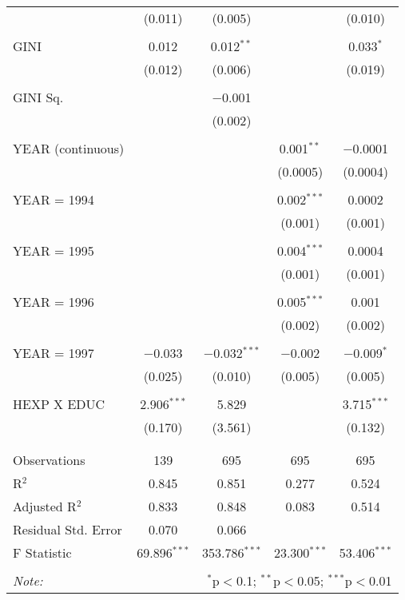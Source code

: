 \documentclass[12pt,a4paper]{article}\usepackage[]{graphicx}\usepackage[]{color}
\begin{document}
\begin{table}[!htbp]
\begin{tabular}{@{\extracolsep{5pt}}lcccc}
  & (0.011) & (0.005) &  & (0.010) \\ 
  & & & & \\ 
 GINI & 0.012 & 0.012$^{**}$ &  & 0.033$^{*}$ \\ 
  & (0.012) & (0.006) &  & (0.019) \\ 
  & & & & \\ 
 GINI Sq. &  & $-$0.001 &  &  \\ 
  &  & (0.002) &  &  \\ 
  & & & & \\ 
 YEAR (continuous) &  &  & 0.001$^{**}$ & $-$0.0001 \\ 
  &  &  & (0.0005) & (0.0004) \\ 
  & & & & \\ 
 YEAR = 1994 &  &  & 0.002$^{***}$ & 0.0002 \\ 
  &  &  & (0.001) & (0.001) \\ 
  & & & & \\ 
 YEAR = 1995 &  &  & 0.004$^{***}$ & 0.0004 \\ 
  &  &  & (0.001) & (0.001) \\ 
  & & & & \\ 
 YEAR = 1996 &  &  & 0.005$^{***}$ & 0.001 \\ 
  &  &  & (0.002) & (0.002) \\ 
  & & & & \\ 
 YEAR = 1997 & $-$0.033 & $-$0.032$^{***}$ & $-$0.002 & $-$0.009$^{*}$ \\ 
  & (0.025) & (0.010) & (0.005) & (0.005) \\ 
  & & & & \\ 
 HEXP X EDUC & 2.906$^{***}$ & 5.829 &  & 3.715$^{***}$ \\ 
  & (0.170) & (3.561) &  & (0.132) \\ 
  & & & & \\ 
\hline \\[-1.8ex] 
Observations & 139 & 695 & 695 & 695 \\ 
R$^{2}$ & 0.845 & 0.851 & 0.277 & 0.524 \\ 
Adjusted R$^{2}$ & 0.833 & 0.848 & 0.083 & 0.514 \\ 
Residual Std. Error & 0.070 & 0.066 &  &  \\ 
F Statistic & 69.896$^{***}$ & 353.786$^{***}$ & 23.300$^{***}$ & 53.406$^{***}$ \\ 
\hline 
\hline \\[-1.8ex] 
\textit{Note:}  & \multicolumn{4}{r}{$^{*}$p$<$0.1; $^{**}$p$<$0.05; $^{***}$p$<$0.01} \\ 
\end{tabular} 
\end{table} 
\end{document}
